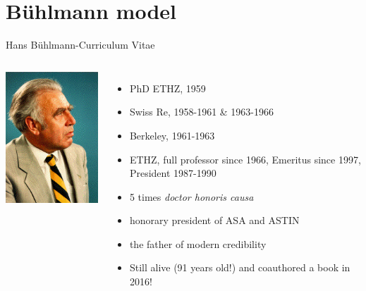\documentclass[11pt]{beamer}
\begin{document}
\section{B\"uhlmann model}
\begin{frame}{Hans B{\"u}hlmann-Curriculum Vitae}

\begin{columns}
\includegraphics[scale=0.6]{Buehlmannp.png}

\begin{itemize}
\item PhD ETHZ, 1959
\item Swiss Re, 1958-1961 \& 1963-1966
\item Berkeley, 1961-1963
\item ETHZ, full professor since 1966, Emeritus since 1997, President 1987-1990
\item 5 times \emph{doctor honoris causa}
\item honorary president of ASA and ASTIN
\item the father of modern credibility

\item Still alive (91 years old!) and coauthored a book in 2016!
\end{itemize}

\end{columns}

\end{frame}
\end{document}
